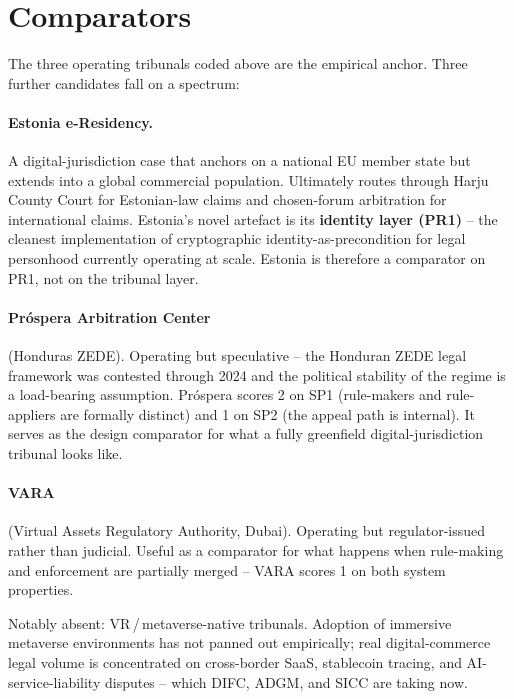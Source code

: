 \documentclass[11pt,letterpaper]{article}
\begin{document}
\section{Comparators}

The three operating tribunals coded above are the empirical anchor. Three further candidates fall on a spectrum:

\paragraph{Estonia e-Residency.} A digital-jurisdiction case that anchors on a national EU member state but extends into a global commercial population. Ultimately routes through Harju County Court for Estonian-law claims and chosen-forum arbitration for international claims. Estonia's novel artefact is its \textbf{identity layer (PR1)} -- the cleanest implementation of cryptographic identity-as-precondition for legal personhood currently operating at scale. Estonia is therefore a comparator on PR1, not on the tribunal layer.

\paragraph{Pr\'ospera Arbitration Center} (Honduras ZEDE). Operating but speculative -- the Honduran ZEDE legal framework was contested through 2024 and the political stability of the regime is a load-bearing assumption. Pr\'ospera scores 2 on SP1 (rule-makers and rule-appliers are formally distinct) and 1 on SP2 (the appeal path is internal). It serves as the design comparator for what a fully greenfield digital-jurisdiction tribunal looks like.

\paragraph{VARA} (Virtual Assets Regulatory Authority, Dubai). Operating but regulator-issued rather than judicial. Useful as a comparator for what happens when rule-making and enforcement are partially merged -- VARA scores 1 on both system properties.

Notably absent: VR\,/\,metaverse-native tribunals. Adoption of immersive metaverse environments has not panned out empirically; real digital-commerce legal volume is concentrated on cross-border SaaS, stablecoin tracing, and AI-service-liability disputes -- which DIFC, ADGM, and SICC are taking now.
\end{document}
